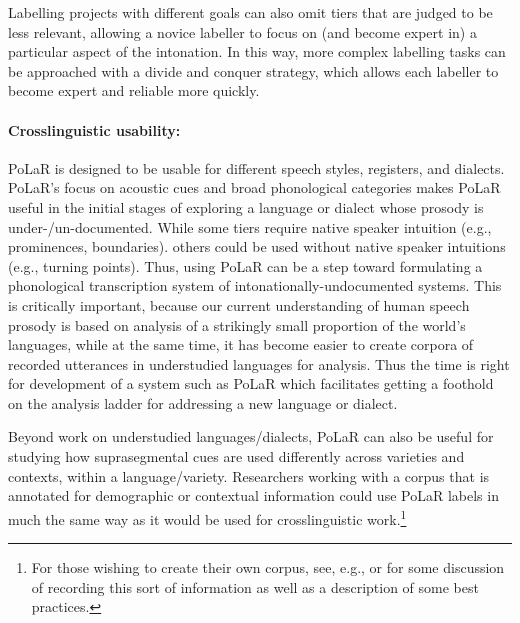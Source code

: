 Labelling projects with different goals can also omit tiers that are judged to be less relevant, allowing a novice labeller to focus on (and become expert in) a particular aspect of the intonation.  In this way, more complex labelling tasks can be approached with a divide and conquer strategy, which allows each labeller to become expert and reliable more quickly. 

\paragraph{Crosslinguistic usability:}
PoLaR is designed to be usable for different speech styles, registers, and dialects. PoLaR’s focus on acoustic cues and broad phonological categories makes PoLaR useful in the initial stages of exploring a language or dialect whose prosody is under-\slash un-documented.  While some tiers require native speaker intuition (e.g., prominences, boundaries). others could be used without native speaker intuitions (e.g., turning points).  Thus, using PoLaR can be a step toward formulating a phonological transcription system of intonationally-undocumented systems.  This is critically important, because our current understanding of human speech prosody is based on analysis of a strikingly small proportion of the world’s languages, while at the same time, it has become easier to create corpora of recorded utterances in understudied languages for analysis.  Thus the time is right for development of a system such as PoLaR which facilitates getting a foothold on the analysis ladder for addressing a new language or dialect. 

Beyond work on understudied languages\slash dialects, PoLaR can also be useful for studying how suprasegmental cues are used differently across varieties and contexts, within a language\slash variety. Researchers working with a corpus that is annotated for demographic or contextual information could use PoLaR labels in much the same way as it would be used for crosslinguistic work.\footnote{For those wishing to create their own corpus, see, e.g., \citealt{meyerhoff-11} or \citealt{podesvasharma13} for some discussion of recording this sort of information as well as a description of some best practices.}


